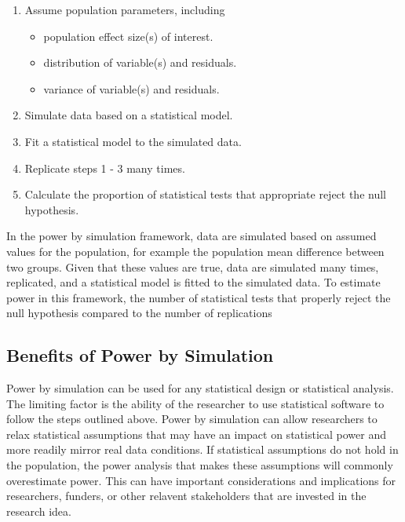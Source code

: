 \documentclass[man,mask,floatsintext]{apa6}
\providecommand{\tightlist}{%
  \setlength{\itemsep}{0pt}\setlength{\parskip}{0pt}}
\begin{document}
\begin{enumerate}
\def\labelenumi{\arabic{enumi}.}
\tightlist
\item
  Assume population parameters, including

  \begin{itemize}
  \tightlist
  \item
    population effect size(s) of interest.
  \item
    distribution of variable(s) and residuals.
  \item
    variance of variable(s) and residuals.
  \end{itemize}
\item
  Simulate data based on a statistical model.
\item
  Fit a statistical model to the simulated data.
\item
  Replicate steps 1 - 3 many times.
\item
  Calculate the proportion of statistical tests that appropriate reject the null hypothesis.
\end{enumerate}

In the power by simulation framework, data are simulated based on assumed values for the population, for example the population mean difference between two groups. Given that these values are true, data are simulated many times, replicated, and a statistical model is fitted to the simulated data. To estimate power in this framework, the number of statistical tests that properly reject the null hypothesis compared to the number of replications

\hypertarget{benefits-of-power-by-simulation}{%
\subsection{Benefits of Power by Simulation}\label{benefits-of-power-by-simulation}}

Power by simulation can be used for any statistical design or statistical analysis. The limiting factor is the ability of the researcher to use statistical software to follow the steps outlined above. Power by simulation can allow researchers to relax statistical assumptions that may have an impact on statistical power and more readily mirror real data conditions. If statistical assumptions do not hold in the population, the power analysis that makes these assumptions will commonly overestimate power. This can have important considerations and implications for researchers, funders, or other relavent stakeholders that are invested in the research idea.
\end{document}
